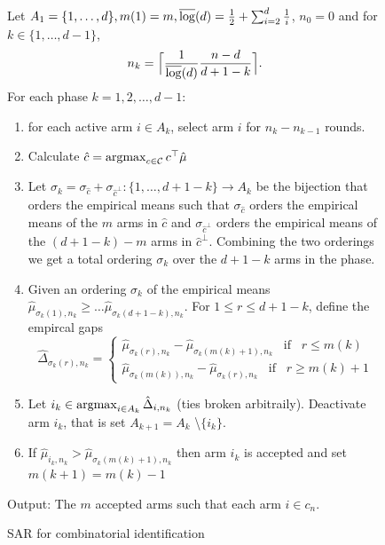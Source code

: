 \documentclass[11.75pt,oneside]{amsart}
\DeclarePairedDelimiter{\ceil}{\lceil}{\rceil}
\begin{document}
\begin{figure}[ht]
\raggedright
Let $A_1 = \{1, \hdots, d\}, m(1) = m,  \overline{\log}(d) = \frac{1}{2} + \sum_{i=2}^d\frac{1}{i}$, $n_0 = 0$ and for $k \in \{1, \hdots, d-1\}$,
$$ n_k = \ceil[\Big]{\frac{1}{\LG} \frac{n-d}{d+1-k}}.$$
\vspace{5pt}
For each phase $k=1,2, \hdots, d-1$:\\
\vspace{5pt}
\begin{enumerate}
\item{for each active arm $i \in A_k$, select arm $i$ for $n_{k} - n_{k-1}$ rounds.}
\vspace{5pt}
\item{Calculate $\hat{c} = \mathop{\mathrm{argmax}}_{c \in \mathcal{C}} c^{\top} \hat{\mu}$}
\vspace{5pt}
\item{Let $\sigma_k = \sigma_{\hat{c}} + \sigma_{\hat{c}^{\perp}} : \{1,\hdots,d+1-k\} \to A_k$ be the bijection that orders the empirical means such that $\sigma_{\hat{c}}$ orders the empirical means of the $m$ arms in $\hat{c}$ and $\sigma_{\hat{c}^{\perp}}$ orders the empirical means of the $(d+1-k)-m$ arms in $\hat{c}^{\perp}$. Combining the two orderings we get a total ordering $\sigma_k$ over the $d+1-k$ arms in the phase.}
\vspace{5pt}
\item{Given an ordering $\sigma_k$ of the empirical means $\hat{\mu}_{\sigma_k(1),n_k} \ge \hdots \hat{\mu}_{\sigma_k(d+1-k),n_k}$. For $1 \le r \le d+1-k$, define the empircal gaps}
$$  \hat{\Delta}_{\sigma_k(r),n_k} = \left\{
     \begin{array}{lr}
       \hat{\mu}_{\sigma_k(r),n_k} - \hat{\mu}_{\sigma_k(m(k)+1),n_k} \hspace{10pt} \text{if} \hspace{10pt} r \le m(k)\\
       \hat{\mu}_{\sigma_k(m(k)),n_k} - \hat{\mu}_{\sigma_k(r),n_k} \hspace{10pt} \text{if} \hspace{10pt} r \ge m(k) + 1
     \end{array}
   \right.$$
\vspace{5pt}
\item{Let $i_k \in \mathop{\mathrm{argmax}}_{i \in A_k} \hat{\Delta}_{i,n_k}$ (ties broken arbitraily). Deactivate arm $i_k$, that is set $A_{k+1} = A_k$ \textbackslash $\{i_k\}$.} 
\vspace{5pt}
\item{If $\hat{\mu}_{i_k,n_k} > \hat{\mu}_{\sigma_k(m(k)+1),n_k}$ then arm $i_k$ is accepted and set $m(k+1) = m(k) - 1$}
\end{enumerate}
\vspace{5pt}
Output: The $m$ accepted arms such that each arm $i \in c_n$.
\caption{\label{combinsar} SAR for combinatorial identification}
\end{figure}
\end{document}
